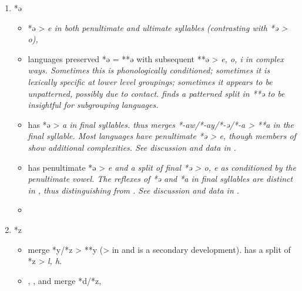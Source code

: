 \begin{enumerate}
\begin{itemize}[topsep=0pt,leftmargin=\dimexpr 15pt-6pt]
						 and ) along with possible traces in others
						\citep[40--52, 133]{Collins1983}.
						See discussion and data in , and .
			\item	Most  languages have *q/*h > {\0},
						but  has *q > \it{k} in all positions ().
		\end{itemize}
	\item	*ə
		\begin{itemize}[topsep=0pt,leftmargin=\dimexpr 15pt-6pt]
			\item	{} *ə > \it{e} in both penultimate
						and ultimate syllables (contrasting with  *ə > \it{o}),
			\item	{} languages preserved *ə = **ə with subsequent
						**ə > \it{e, o, i} in complex ways.
						Sometimes this is phonologically conditioned; sometimes it is
						lexically specific at lower level groupings; sometimes it appears
						to be unpatterned, possibly due to contact.
						\citet[65ff]{Collins1983} finds a patterned split in **ə to be insightful
						for subgrouping  languages.
			\item	{} has *ə > \it{a} in final syllables.
						 thus merges *-aw/*-ay/*-ə/*-a >
						**a in the final syllable.
						Most  languages have penultimate
						*ə > \it{e,} though members of  show additional complexities.
						See discussion and data in .
			\item	{} has penultimate *ə > \it{e}
						and a split of final *ə > \it{o,
						e} as conditioned by the penultimate vowel.
						The reflexes of *ə
						and *a in final syllables are distinct in ,
						thus distinguishing  from .
						See discussion and data in .
			\item[] \hp{\,}
		\end{itemize}
	\item	*z
		\begin{itemize}[topsep=0pt,leftmargin=\dimexpr 15pt-6pt]
			\item	{} merge *y/*z > **y (> {\0} in 
						and  is a secondary development).
						 has a split of *z > \it{l, h}.
			\item	{},
						, and  merge *d/*z,

\end{itemize}
\end{enumerate}
